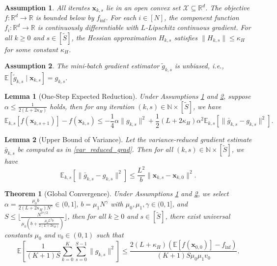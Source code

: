 \documentclass[10pt,a4paper]{amsart}
\newtheorem{assumption}{Assumption}
\newtheorem{lemma}{Lemma}
\newtheorem{theorem}{Theorem}
\newcommand{\barg}{\bar{g}}
\newcommand{\bx}{\boldsymbol{x}}
\begin{document}
\begin{assumption}\label{assump1}
All iterates $\bx_{k,s}$ lie in an open convex set $\mathcal{X} \subseteq \mathbb{R}^d$. The objective $f: \mathbb{R}^d \to \mathbb{R}$ is bounded below by $f_{\inf}$. For each $i \in [N]$, the component function $f_i : \mathbb{R}^d \to \mathbb{R}$ is continuously differentiable with $L$-Lipschitz continuous gradient. For all $k \geq 0$ and $s \in [\tilde{S}]$, the Hessian approximation $H_{k,s}$ satisfies $\|H_{k,s}\| \leq \kappa_H$ for some constant $\kappa_H$.
\end{assumption}

\begin{assumption}\label{assump2}
The mini-batch gradient estimator $\tilde{g}_{k,s}$ is unbiased, i.e.,
$\mathbb{E}[\tilde{g}_{k,s} \mid \bx_{k,s}] = g_{k,s}$.
\end{assumption}

\begin{lemma}[One-Step Expected Reduction]\label{lem: One-Step Expected Reduction}
Under Assumptions \ref{assump1} and \ref{assump2}, suppose
$\alpha \leq \frac{1}{2(L + 2\kappa_H)}$ holds, then for any iteration $(k,s)\in \mathbb{N}\times [\tilde{S}]$,  we have
\begin{equation*}
     \mathbb{E}_{k,s}[f(\bx_{k,s+1})] - f(\bx_{k,s}) \leq -\frac{1}{4}\alpha\|g_{k,s}\|^2 + \frac{1}{2}(L + 2\kappa_H)\alpha^2\mathbb{E}_{k,s}[\| \barg_{k,s} - g_{k,s}\|^2].
\end{equation*}
\end{lemma}

\begin{lemma}[Upper Bound of Variance]\label{lem:Upper Bound of Variance}
Let the variance-reduced gradient estimate $\barg_{k,s}$ be computed as in \eqref{var_reduced_grad}. Then for all $(k,s) \in \mathbb{N} \times [\tilde{S}]$, we have
\begin{equation*}
    \mathbb{E}_{k,s}[\|\barg_{k,s} - g_{k,s}\|^2] \leq \frac{L^2}{b}\|\bx_{k,s} - \bx_{k,0}\|^2.
\end{equation*}
\end{lemma}

\begin{theorem}[Global Convergence]\label{thm:Global Convergence}
Under Assumptions \ref{assump1} and \ref{assump2}, we select
$\alpha = \frac{\mu_0 b}{2(L+2\kappa_H)N^\gamma}\in(0,1]$, $b = \mu_1 N^{\gamma}$ with $\mu_0,\mu_1,\gamma \in(0,1]$, and $ S \leq \bigg\lfloor\frac{N^{3\gamma/2}}{\mu_0(b+\frac{\mu_0L^2b}{2(L+2\kappa_H)})}\bigg\rfloor$, then for all $k\geq 0$ and $s\in [\tilde{S}]$, there exist universal constants $\mu_0$ and $v_0 \in (0, 1)$ such that
\begin{equation*}
    \mathbb{E}\left[\frac{1}{(K+1)S}\sum_{k=0}^K\sum_{s=0}^{S-1}\|g_{k,s}\|^2\right] \leq \frac{2(L+\kappa_H)(\mathbb{E}[f(\bx_{0,0})] - f_{\inf})}{(K+1)S\mu_0\mu_1 v_0}.
\end{equation*}

\end{theorem}
\end{document}
